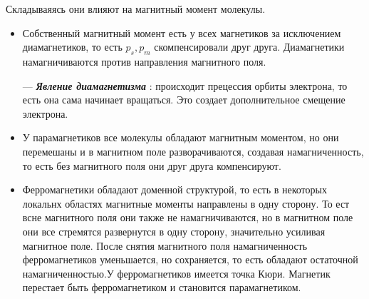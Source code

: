 \documentclass[../main.tex]{subfiles}
\begin{document}
Складываяясь они влияют на магнитный момент молекулы.
\begin{itemize}
    \item Собственный магнитный момент есть у всех магнетиков за исключением диамагнетиков, то есть $p_s, p_m$ скомпенсировали друг друга. Диамагнетики намагничиваются против направления магнитного поля.

          --- \textit{\textbf{Явление диамагнетизма}} : происходит прецессия орбиты электрона, то есть она сама начинает вращаться. Это создает дополнительное смещение электрона.

    \item  У парамагнетиков все молекулы обладают магнитным моментом, но они перемешаны и в магнитном поле разворачиваются,
          создавая намагниченность, то есть без магнитного поля они друг друга компенсируют.

    \item Ферромагнетики обладают доменной структурой, то есть в некоторых локальнх областях магнитные моменты направлены в одну сторону. То ест всне магнитного поля они также
          не намагничиваются, но в магнитном поле они все стремятся развернутся в одну сторону, значительно усиливая магнитное поле.
          После снятия магнитного поля намагниченность ферромагнетиков уменьшается, но сохраняется, то есть обладают остаточной намагниченностью.У ферромагнетиков имеется точка Кюри. Магнетик
          перестает быть ферромагнетиком и становится парамагнетиком.
          \begin{center}


\end{center}
\end{itemize}
\end{document}
